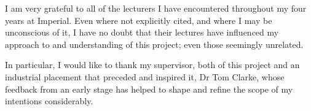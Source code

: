 I am very grateful to all of the lecturers I have encountered throughout my four years at Imperial. Even where not explicitly cited, and where I may be unconscious of it, I have no doubt that their lectures have influenced my approach to and understanding of this project; even those seemingly unrelated.

In particular, I would like to thank my supervisor, both of this project and an industrial placement that preceded and inspired it, Dr Tom Clarke, whose feedback from an early stage has helped to shape and refine the scope of my intentions considerably.